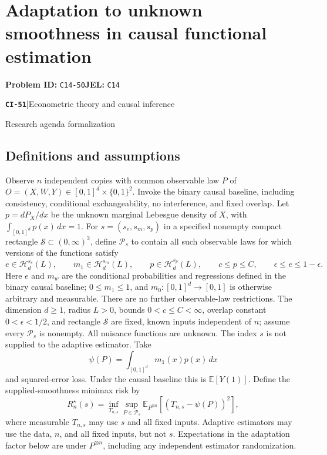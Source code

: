 \documentclass[11pt,a4paper]{article}
\newcommand{\E}{\mathbb E}
\newcommand{\entrymeta}[3]{{\sffamily\small\color{muted}\textbf{\texttt{#1}}\quad|\quad #2\par #3\par}}
\begin{document}
\section*{Adaptation to unknown smoothness in causal functional estimation}
\textbf{Problem ID:} \texttt{C14-50}\quad \textbf{JEL:} \texttt{C14}\par
\label{problem:OP-0530}
\label{beyond:CI-51}
\entrymeta{CI-51}{Econometric theory and causal inference}{Research agenda formalization}
\subsection*{Definitions and assumptions}
Observe $n$ independent copies with common observable law $P$ of $O=(X,W,Y)\in[0,1]^d\times\{0,1\}^2$. Invoke the binary causal baseline, including consistency, conditional exchangeability, no interference, and fixed overlap. Let $p=dP_X/dx$ be the unknown marginal Lebesgue density of $X$, with $\int_{[0,1]^d}p(x)\,dx=1$. For $s=(s_e,s_m,s_p)$ in a specified nonempty compact rectangle $\mathcal S\subset(0,\infty)^3$, define $\mathcal P_s$ to contain all such observable laws for which versions of the functions satisfy
\[
 e\in\mathcal H_d^{s_e}(L),\qquad m_1\in\mathcal H_d^{s_m}(L),\qquad p\in\mathcal H_d^{s_p}(L),
 \qquad c\leq p\leq C,\qquad \epsilon\leq e\leq1-\epsilon.
\]
Here $e$ and $m_w$ are the conditional probabilities and regressions defined in the binary causal baseline; $0\leq m_1\leq1$, and $m_0:[0,1]^d\to[0,1]$ is otherwise arbitrary and measurable. There are no further observable-law restrictions. The dimension $d\geq1$, radius $L>0$, bounds $0<c\leq C<\infty$, overlap constant $0<\epsilon<1/2$, and rectangle $\mathcal S$ are fixed, known inputs independent of $n$; assume every $\mathcal P_s$ is nonempty. All nuisance functions are unknown. The index $s$ is not supplied to the adaptive estimator. Take
\[
 \psi(P)=\int_{[0,1]^d}m_1(x)p(x)\,dx
\]
and squared-error loss. Under the causal baseline this is $\E[Y(1)]$. Define the supplied-smoothness minimax risk by
\[
 R_n^\star(s)=\inf_{T_{n,s}}\sup_{P\in\mathcal P_s}
 \E_{P^{\otimes n}}[(T_{n,s}-\psi(P))^2],
\]
where measurable $T_{n,s}$ may use $s$ and all fixed inputs. Adaptive estimators may use the data, $n$, and all fixed inputs, but not $s$. Expectations in the adaptation factor below are under $P^{\otimes n}$, including any independent estimator randomization.
\end{document}
